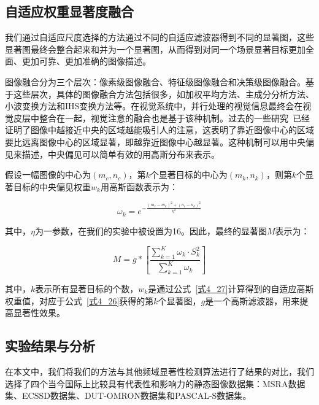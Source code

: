 \subsection{自适应权重显著度融合}
\label{4_2_3}

我们通过自适应尺度选择的方法通过不同的自适应滤波器得到不同的显著图，这些显著图最终会整合起来和并为一个显著图，从而得到对同一个场景显著目标更加全面、更加可靠、更加准确的图像描述。

图像融合分为三个层次：像素级图像融合、特征级图像融合和决策级图像融合\cite{吕超峰2007融合}。基于这些层次，具体的图像融合方法包括很多，如加权平均方法、主成分分析方法、小波变换方法和IHS变换方法等。在视觉系统中，并行处理的视觉信息最终会在视觉皮层中整合在一起，视觉注意的融合也是基于该种机制。过去的一些研究~\cite{JuddICCV2009Learning}已经证明了图像中越接近中央的区域越能吸引人的注意，这表明了靠近图像中心的区域要比远离图像中心的区域显著，即越靠近图像中心越显著。这种机制可以用中央偏见来描述，中央偏见可以简单有效的用高斯分布来表示。

假设一幅图像的中心为$(m_{c},n_{c})$，第$k$个显著目标的中心为$(m_{k},n_{k})$，则第$k$个显著目标的中央偏见权重$w_{k}$用高斯函数表示为：
\begin{linenomath}
\begin{equation}
\omega_k=e^{-\frac{(m_{c}-m_{k})^{2}+(n_{c}-n_{k})^{2}}{\eta ^{2}}}
\label{式4_27}
\end{equation}
\end{linenomath}
其中，$\eta$为一参数，在我们的实验中被设置为16。因此，最终的显著图$M$表示为：
\begin{linenomath}
\begin{equation}
M=g\ast \left[\frac{\sum_{k=1}^{K}\omega_{k}\cdot S_{k}^{2}}{\sum_{k=1}^{K}\omega_{k}}\right]
\label{式4_28}
\end{equation}
\end{linenomath}
其中，$k$表示所有显著目标的个数，$w_{k}$是通过公式~\ref{式4_27}计算得到的自适应高斯权重值，对应于公式~\ref{式4_26}获得的第$k$个显著图，$g$是一个高斯滤波器，用来提高显著性效果。

\subsection{实验结果与分析}
\label{4_2_4}

在本文中，我们将我们的方法与其他频域显著性检测算法进行了结果的对比，我们选择了四个当今国际上比较具有代表性和影响力的静态图像数据集：MSRA数据集\cite{LiuTieCVPR2007Learning}、ECSSD数据集\cite{YanQiongCVPR2013Hierarchical}、DUT-OMRON数据集\cite{YangChuanCVPR2013Manifold}和PASCAL-S数据集\cite{LiYinCVPR2014Secrets}。

